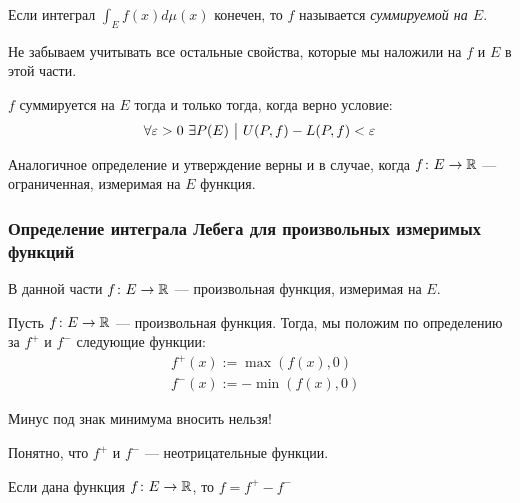 \begin{definition}
	Если интеграл $\int_E f(x)d\mu(x)$ конечен, то $f$ называется \textit{суммируемой на $E$}.
\end{definition}

\begin{anote}
	Не забываем учитывать все остальные свойства, которые мы наложили на $f$ и $E$ в этой части.
\end{anote}

\begin{proposition}
	$f$ суммируется на $E$ тогда и только тогда, когда верно условие:
	\[
		\forall \varepsilon > 0\ \exists P(E) \ \big|\  U(P, f) - L(P, f) < \varepsilon
	\]
\end{proposition}

\begin{note}
	Аналогичное определение и утверждение верны и в случае, когда $f \colon E \to \mathbb{R}$ --- ограниченная, измеримая на $E$ функция.
\end{note}

\subsubsection*{Определение интеграла Лебега для произвольных измеримых функций}

\begin{note}
	В данной части $f \colon E \to \mathbb{R}$ --- произвольная функция, измеримая на $E$.
\end{note}

\begin{definition}
	Пусть $f \colon E \to \mathbb{R}$ --- произвольная функция. Тогда, мы положим по определению за $f^+$ и $f^-$ следующие функции:
	\begin{align*}
		&{f^+(x) := \max(f(x), 0)}
		\\
		&{f^-(x) := -\min(f(x), 0)}
	\end{align*}
\end{definition}

\begin{anote}
	Минус под знак минимума вносить нельзя!
\end{anote}

\begin{note}
	Понятно, что $f^+$ и $f^-$ --- неотрицательные функции.
\end{note}

\begin{proposition}
	Если дана функция $f \colon E \to \mathbb{R}$, то $f = f^+ - f^-$
\end{proposition}

